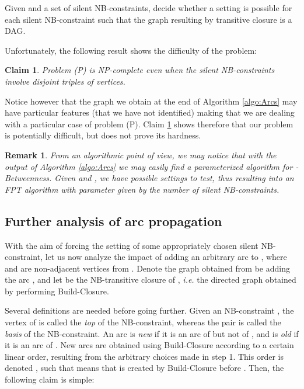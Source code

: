 \documentclass{article}
\newtheorem{fait}{Claim}
\newtheorem{rmk}{Remark}
\newcommand{\br}{\begin{rmk}\rm}
\newcommand{\er}{\end{rmk}}
\newcommand{\bfn}{\begin{fait}}
\newcommand{\efn}{\end{fait}}
\begin{document}
\bigskip
{} Given  and a set of silent NB-constraints, decide whether a setting is possible
for each silent NB-constraint such that the graph resulting by transitive closure is a DAG.
\bigskip



Unfortunately, the following result shows the difficulty of the problem:

\bfn \cite{guttmann2006variations}
Problem (P) is NP-complete even when the silent NB-constraints involve disjoint triples of vertices.
\label{claim:NPc}
\efn

Notice however that the graph  we obtain at the end of Algorithm \ref{algo:Arcs} may have particular 
features (that we have not identified) making that we are dealing
with a particular case of problem (P). Claim \ref{claim:NPc} shows therefore that our problem is
potentially difficult, but does not prove its hardness.
 


\br
From an algorithmic point of view, we may notice that with the output of Algorithm \ref{algo:Arcs}
we may easily find a parameterized algorithm for -{\sc Betweenness}. Given  and ,
we have  possible settings to test, thus resulting into 
an FPT algorithm with parameter  given by the number of silent NB-constraints. 
\er

\subsection{Further analysis of arc propagation}

With the aim of forcing the setting of some appropriately chosen silent NB-constraint,  
let us now analyze the impact of adding an arbitrary arc  to , where  
 and   are non-adjacent vertices from . Denote   the graph 
obtained from  be adding the arc , and  let  be the NB-transitive closure of 
,  {\em i.e.} the directed graph obtained by performing 
Build-Closure. 

Several definitions are needed before going further. Given an NB-constraint  , the vertex
 of  is called the {\em top} of the NB-constraint, whereas the pair   is called
the {\em basis} of the NB-constraint. An arc  is {\em new} if it is an arc of  but
not of , and is {\em old} if it is an arc of . New arcs are obtained using 
Build-Closure according to a certain linear order, resulting from the arbitrary choices made in step 1. This order is denoted , such that  means that  is created by Build-Closure before .
Then, the following claim is simple:
\end{document}
